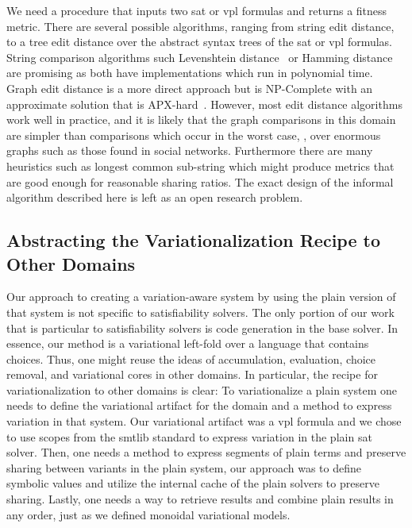 We need a procedure that inputs two \ac{sat} or \ac{vpl} formulas and returns a
fitness metric. There are several possible algorithms, ranging from string edit
distance, to a tree edit distance over the abstract syntax trees of the \ac{sat}
or \ac{vpl} formulas. String comparison algorithms such Levenshtein
distance~\cite{Levenshtein_SPD66} or Hamming distance~\cite{H:BST50} are
promising as both have implementations which run in polynomial time. Graph edit
distance is a more direct approach but is NP-Complete with an approximate
solution that is APX-hard~\cite{hardnessOfGraphEditDistance}. However, most edit
distance algorithms work well in practice, and it is likely that the graph
comparisons in this domain are simpler than comparisons which occur in the worst
case, \eg{}, over enormous graphs such as those found in social networks.
Furthermore there are many heuristics such as longest common sub-string which
might produce metrics that are good enough for reasonable sharing ratios. The
exact design of the informal algorithm described here is left as an open
research problem.

\subsection{Abstracting the Variationalization Recipe to Other Domains}
Our approach to creating a variation-aware system by using the plain version of
that system is not specific to satisfiability solvers. The only portion of our
work that is particular to satisfiability solvers is code generation in the base
solver. In essence, our method is a variational left-fold over a language that
contains choices. Thus, one might reuse the ideas of accumulation, evaluation,
choice removal, and variational cores in other domains. In particular, the
recipe for variationalization to other domains is clear: To variationalize a
plain system one needs to define the variational artifact for the domain and a
method to express variation in that system. Our variational artifact was a
\ac{vpl} formula and we chose to use scopes from the \acl{smtlib} standard to
express variation in the plain \ac{sat} solver. Then, one needs a method to
express segments of plain terms and preserve sharing between variants in the
plain system, our approach was to define symbolic values and utilize the
internal cache of the plain solvers to preserve sharing. Lastly, one needs a way
to retrieve results and combine plain results in any order, just as we defined
monoidal variational models.

